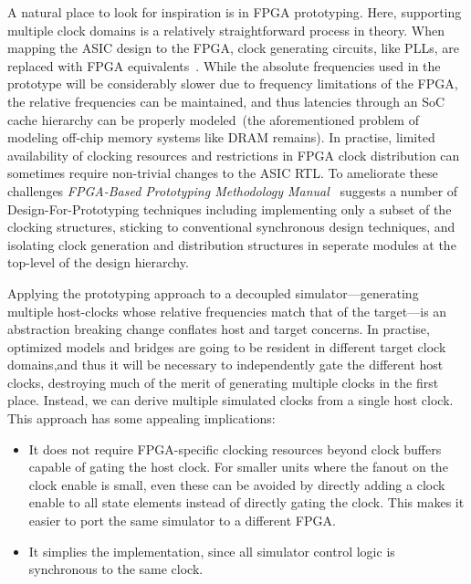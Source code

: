 A natural place to look for inspiration is in FPGA prototyping. Here, supporting multiple clock domains is a relatively
straightforward process in theory. When mapping the ASIC design to the FPGA,
clock generating circuits, like PLLs, are replaced with FPGA
equivalents~\cite{FPMM}. While the absolute frequencies used in the prototype
will be considerably slower due to frequency limitations of the FPGA, the
relative frequencies can be maintained, and thus latencies through an SoC cache
hierarchy can be properly modeled~(the aforementioned problem of modeling
off-chip memory systems like DRAM remains).  In practise, limited availability
of clocking resources and restrictions in FPGA clock distribution can sometimes
require non-trivial changes to the ASIC RTL. To ameliorate these challenges
\emph{FPGA-Based Prototyping Methodology Manual}~\cite{FPMM} suggests a number
of Design-For-Prototyping techniques including implementing only a subset of
the clocking structures, sticking to conventional synchronous design
techniques, and isolating clock generation and distribution structures in
seperate modules at the top-level of the design hierarchy.

Applying the prototyping approach to a decoupled simulator---generating
multiple host-clocks whose relative frequencies match that of the target---is
an abstraction breaking change conflates host and target concerns.  In practise,
optimized models and bridges are going to be resident in different target clock
domains,and thus it will be necessary to independently gate the different
host clocks, destroying much of the merit of generating multiple clocks in
the first place. Instead, we can derive multiple simulated clocks from a single
host clock. This approach has some appealing implications:
\begin{itemize}
 \item It does not require FPGA-specific clocking resources beyond clock
 buffers capable of gating the host clock. For smaller units where the fanout
 on the clock enable is small, even these can be avoided by directly adding a clock enable
 to all state elements instead of directly gating the clock. This makes it easier
 to port the same simulator to a different FPGA.

 \item It simplies the implementation, since all simulator control logic is synchronous to 
 the same clock.
\end{itemize}

